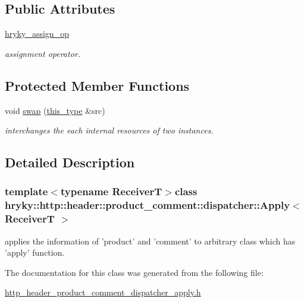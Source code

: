 \subsection*{Public Attributes}
\begin{DoxyCompactItemize}
\item 
\hypertarget{classhryky_1_1http_1_1header_1_1product__comment_1_1dispatcher_1_1_apply_a1d743638e97d1bb195761fbb3598486d}{\hyperlink{classhryky_1_1http_1_1header_1_1product__comment_1_1dispatcher_1_1_apply_a1d743638e97d1bb195761fbb3598486d}{hryky\-\_\-assign\-\_\-op}}\label{classhryky_1_1http_1_1header_1_1product__comment_1_1dispatcher_1_1_apply_a1d743638e97d1bb195761fbb3598486d}

\begin{DoxyCompactList}\small\item\em assignment operator. \end{DoxyCompactList}\end{DoxyCompactItemize}
\subsection*{Protected Member Functions}
\begin{DoxyCompactItemize}
\item 
\hypertarget{classhryky_1_1http_1_1header_1_1product__comment_1_1dispatcher_1_1_base_ab2b137d16fbe40d839ee136bd5304cab}{void \hyperlink{classhryky_1_1http_1_1header_1_1product__comment_1_1dispatcher_1_1_base_ab2b137d16fbe40d839ee136bd5304cab}{swap} (\hyperlink{classhryky_1_1http_1_1header_1_1product__comment_1_1dispatcher_1_1_apply_a9e25411615673baf2c551497375a509e}{this\-\_\-type} \&src)}\label{classhryky_1_1http_1_1header_1_1product__comment_1_1dispatcher_1_1_base_ab2b137d16fbe40d839ee136bd5304cab}

\begin{DoxyCompactList}\small\item\em interchanges the each internal resources of two instances. \end{DoxyCompactList}\end{DoxyCompactItemize}


\subsection{Detailed Description}
\subsubsection*{template$<$typename Receiver\-T$>$class hryky\-::http\-::header\-::product\-\_\-comment\-::dispatcher\-::\-Apply$<$ Receiver\-T $>$}

applies the information of 'product' and 'comment' to arbitrary class which has 'apply' function. 

The documentation for this class was generated from the following file\-:\begin{DoxyCompactItemize}
\item 
\hyperlink{http__header__product__comment__dispatcher__apply_8h}{http\-\_\-header\-\_\-product\-\_\-comment\-\_\-dispatcher\-\_\-apply.\-h}\end{DoxyCompactItemize}
